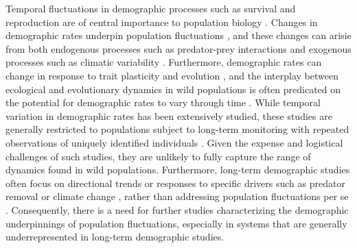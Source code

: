 \documentclass[11pt]{article}
\begin{document}
Temporal fluctuations in demographic processes such as survival and reproduction
are of central importance to population biology
\citep{twombly1994,fox2000population,koons2016life}.
Changes in demographic rates underpin population fluctuations \citep{coulson2005decomposing},
and these changes can arisie from both 
endogenous processes such as predator-prey interactions 
\citep{rosenzweig1963}
and exogenous processes such as climatic variability
\citep{elton1924}.
Furthermore, demographic rates can change in response to trait plasticity and evolution
\citep{ellner2011does, bonnet2019role},
and the interplay between ecological and evolutionary dynamics in wild populations 
is often predicated on the potential for demographic rates to vary through time
\citep{ellner2011does, coulson2006putting, siepielski2009s, ozgul2010coupled}.
While temporal variation in demographic rates has been extensively studied,
these studies are generally restricted to populations subject to long-term monitoring
with repeated observations of uniquely identified individuals 
\citep[e.g., mark-recapture;][]{fujiwara2002}.
Given the expense and logistical challenges of such studies, 
they are unlikely to fully capture the range of dynamics found in wild populations.
Furthermore, long-term demographic studies often focus on directional trends
or responses to specific drivers such as predator removal 
\citep[e.g., ][]{ diller2016demographic}
or climate change \citep{hunter2010climate},
rather than addressing 
population fluctuations per se \citep[but see][]
{white2007irruptive, koons2017understanding, taylor2018demographic, hoy2020fluctuations}.
Consequently, 
there is a need for further studies characterizing the demographic underpinnings 
of population fluctuations, 
especially in systems that are generally underrepresented 
in long-term demographic studies.
\end{document}
